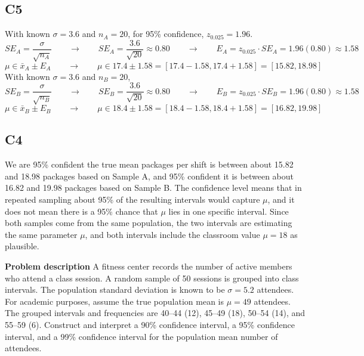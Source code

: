 \begin{ExamProblems}
		\subsection*{C5}
		With known $\sigma = 3.6$ and $n_A = 20$, for 95\% confidence, $z_{0.025}=1.96$.
		\[
		SE_A = \frac{\sigma}{\sqrt{n_A}}  \qquad \longrightarrow \qquad SE_A = \frac{3.6}{\sqrt{20}} \approx 0.80  \qquad \longrightarrow \qquad  E_A = z_{0.025} \cdot SE_A = 1.96(0.80) \approx 1.58
		\]
		\[
		\mu \in \bar{x}_A \pm E_A  \qquad \longrightarrow \qquad \mu \in 17.4 \pm 1.58 = [17.4 - 1.58, 17.4 + 1.58] = [15.82, 18.98]
		\]
		With known $\sigma = 3.6$ and $n_B = 20$,
		\[
		SE_B = \frac{\sigma}{\sqrt{n_B}}  \qquad \longrightarrow \qquad SE_B = \frac{3.6}{\sqrt{20}} \approx 0.80  \qquad \longrightarrow \qquad  E_B = z_{0.025} \cdot SE_B = 1.96(0.80) \approx 1.58
		\]
		\[
		\mu \in \bar{x}_B \pm E_B   \qquad \longrightarrow \qquad \mu \in 18.4 \pm 1.58 = [18.4 - 1.58, 18.4 + 1.58] = [16.82, 19.98]
		\]

		\subsection*{C4}
		We are 95\% confident the true mean packages per shift is between about 15.82 and 18.98 packages based on Sample A, and 95\% confident it is between about 16.82 and 19.98 packages based on Sample B. The confidence level means that in repeated sampling about 95\% of the resulting intervals would capture $\mu$, and it does not mean there is a 95\% chance that $\mu$ lies in one specific interval. Since both samples come from the same population, the two intervals are estimating the same parameter $\mu$, and both intervals include the classroom value $\mu = 18$ as plausible.

		\newpage
		\item
		\textbf{Problem description}
		A fitness center records the number of active members who attend a class session.
		A random sample of 50 sessions is grouped into class intervals. The population standard deviation is known to be \(\sigma = 5.2\) attendees.
		For academic purposes, assume the true population mean is \(\mu = 49\) attendees.
		The grouped intervals and frequencies are 40--44 (12), 45--49 (18), 50--54 (14), and 55--59 (6).
		Construct and interpret a 90\% confidence interval, a 95\% confidence interval, and a 99\% confidence interval for the population mean number of attendees.


\end{ExamProblems}

